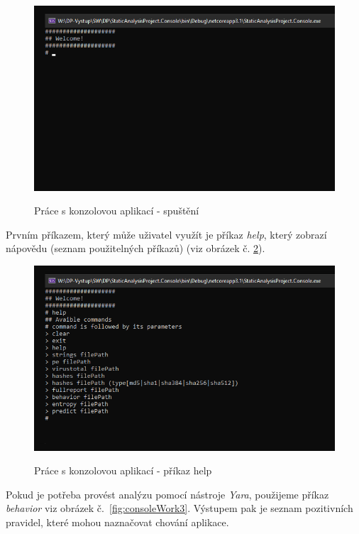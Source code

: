 \begin{figure}[H]
    \caption{Práce s konzolovou aplikací - spuštění}
    \centering
    \includegraphics[width=135mm,scale=0.5]{Figures/obrazky/konzole-krok1.png}
    \label{fig:consoleWork1}
\end{figure}

Prvním příkazem, který může uživatel využít je příkaz \emph{help}, který zobrazí nápovědu (seznam použitelných příkazů) (viz obrázek č. \ref{fig:consoleWork2}).

\begin{figure}[H]
    \caption{Práce s konzolovou aplikací - příkaz help}
    \centering
    \includegraphics[width=135mm,scale=0.5]{Figures/obrazky/konzole-krok2.png}
    \label{fig:consoleWork2}
\end{figure}

Pokud je potřeba provést analýzu pomocí nástroje \emph{Yara}, použijeme příkaz \emph{behavior} viz obrázek č.~\ref{fig:consoleWork3}. Výstupem pak je seznam pozitivních pravidel, které mohou naznačovat chování aplikace. 


